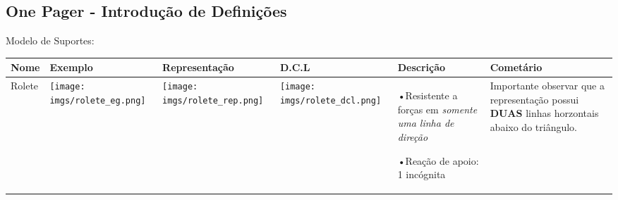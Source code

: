 \documentclass{article}
\begin{document}
        \subsection{One Pager - Introdução de Definições}
                Modelo de Suportes:
                \begin{table}[h]\tiny
                    \begin{tabularx}{\textwidth}{|l|X|X|X|l|l|}\hline
                        \textbf{Nome} & \textbf{Exemplo} & \textbf{Representação} & \textbf{D.C.L} & \textbf{Descrição} & \textbf{Cometário} \\ \hline
    
                        Rolete & 
    
                            \begin{minipage}{.2\textwidth}
                                \centering
                                \texttt{[image: imgs/rolete\_eg.png]}
                            \end{minipage} &
    
                            \begin{minipage}{.2\columnwidth}
                                \centering
                                \texttt{[image: imgs/rolete\_rep.png]}
                            \end{minipage} &
    
                            \begin{minipage}{.2\columnwidth}
                                \centering
                                \texttt{[image: imgs/rolete\_dcl.png]}
                            \end{minipage} &
    
                            \begin{minipage}{.1\columnwidth}
                                \tiny
                                •Resistente a forças em \emph{somente uma linha de direção}
    
                                    •Reação de apoio: 1 incógnita
                            \end{minipage}&
    
                            \begin{minipage}{.1\columnwidth}
                                \vspace{5px}
                                \tiny
                                Importante observar que a representação possui \textbf{DUAS} linhas horzontais abaixo do triângulo.
                                \vspace{5px}
                            \end{minipage} \\ \hline
    

\end{tabularx}
\end{table}
\end{document}
